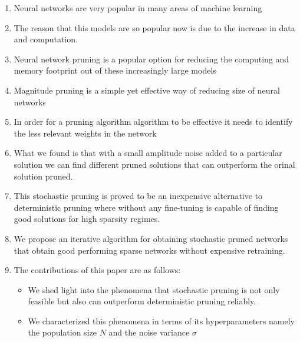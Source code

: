 \begin{enumerate}
    \item Neural networks are very popular in many areas of machine learning
    \item The reason that this models are so popular now is due to the increase
        in data and computation.
    \item Neural network pruning is a popular option for reducing the computing
        and memory footprint out of these increasingly large models
    \item Magnitude pruning is a simple yet effective way of reducing size of
        neural networks
    \item In order for a pruning algorithm algorithm to be effective it needs
        to identify the less relevant weights in the network
    \item What we found is that with a small amplitude noise added to a
        particular solution we can find different pruned solutions that can
        outperform the orinal solution pruned.
    \item This stochastic pruning is proved to be an inexpensive alternative
        to deterministic pruning where without any fine-tuning is capable of
        finding good solutions for high sparsity regimes.
    \item We propose an iterative algorithm for obtaining stochastic pruned
        networks that obtain good performing sparse networks without expensive
        retraining.
        

    \item The contributions of this paper are as follows:
     \begin{itemize}
         \item We shed light into the phenomena that stochastic pruning is not
             only feasible but also can outperform deterministic pruning
             reliably.
         \item  We characterized this phenomena in terms of its hyperparameters
             namely the population size $N$ and the noise variance $\sigma$

     \end{itemize}

\end{enumerate}
    





